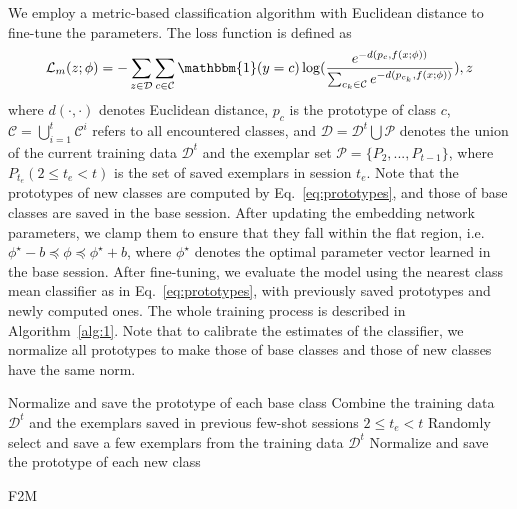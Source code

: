 \documentclass{article}
\begin{document}
We employ a metric-based classification algorithm with Euclidean distance to fine-tune the parameters. The loss function is defined as
\begin{equation}\label{eq:euclidean}
    \mathcal{L}_{m}(z;\phi) = - \sum_{z\in\mathcal{D}}\sum_{c\in\mathcal{C}}\mathbbm{1}(y=c)\log(\frac{e^{-d(p_{c},f(x;\phi))}}{\sum_{c_k\in \mathcal{C}}e^{-d(p_{c_k},f(x;\phi))}}),
z\end{equation}
where $d(\cdot,\cdot)$ denotes Euclidean distance, $p_c$ is the prototype of class $c$, $\mathcal{C}=\bigcup_{i=1}^t \mathcal{C}^{i}$ refers to all encountered classes, and $\mathcal{D}=\mathcal{D}^t\bigcup\mathcal{P}$ denotes the union of the current training data $\mathcal{D}^t$ and the exemplar set $\mathcal{P}=\{P_2,...,P_{t-1}\}$, where $P_{t_e} (2 \leq t_e<t)$ is the set of saved exemplars in session $t_e$. 
Note that the prototypes of new classes are computed by Eq.~\ref{eq:prototypes}, and those of base classes are saved in the base session. After updating the embedding network parameters, we clamp them to ensure that they fall within the flat region, i.e. $\phi^\star-b \preceq \phi \preceq \phi^\star +b$, where $\phi^\star$ denotes the optimal parameter vector learned in the base session. After fine-tuning, we evaluate the model using the nearest class mean classifier as in Eq.~\ref{eq:prototypes}, with previously saved prototypes and newly computed ones. The whole training process is described in Algorithm~\ref{alg:1}. Note that to calibrate the estimates of the classifier, we normalize all prototypes to make those of base classes and those of new classes have the same norm.

\begin{algorithm}[t]
\SetAlgoLined
{}
\tcp{\textcolor{blue}{Training over base classes $t=1$}}
Normalize and save the prototype of each base class\;
\BlankLine
\tcp{\textcolor{blue}{Incremental learning $t\geq 2$}}
Combine the training data $\mathcal{D}^t$ and the exemplars saved in previous few-shot sessions $2 \leq t_e<t$\;
Randomly select and save a few exemplars from the training data $\mathcal{D}^t$\;
Normalize and save the prototype of each new class\;
\caption{F2M} \label{alg:1}
\end{algorithm} 
\end{document}
